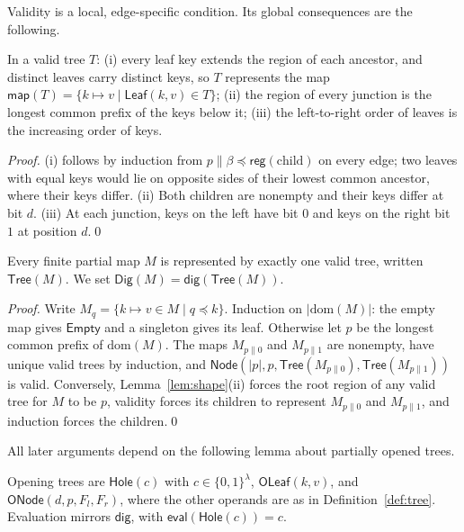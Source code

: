 \documentclass[runningheads]{llncs}
\newcommand{\dig}{\mathsf{dig}}
\newcommand{\Tree}{\mathsf{Tree}}
\newcommand{\Leaf}{\mathsf{Leaf}}
\newcommand{\Node}{\mathsf{Node}}
\newcommand{\Empty}{\mathsf{Empty}}
\newcommand{\reg}{\mathsf{reg}}
\newcommand{\map}{\mathsf{map}}
\newcommand{\eval}{\mathsf{eval}}
\newcommand{\Hole}{\mathsf{Hole}}
\newcommand{\OLeaf}{\mathsf{OLeaf}}
\newcommand{\ONode}{\mathsf{ONode}}
\newcommand{\dom}{\mathrm{dom}}
\newcommand{\cat}{\mathbin{\|}}
\begin{document}
Validity is a local, edge-specific condition. Its global consequences are the following.

\begin{lemma}[Shape]\label{lem:shape}
In a valid tree $T$: (i) every leaf key extends the region of each ancestor, and distinct leaves carry distinct keys, so $T$ represents the map $\map(T) = \{k \mapsto v \mid \Leaf(k,v) \in T\}$; (ii) the region of every junction is the longest common prefix of the keys below it; (iii) the left-to-right order of leaves is the increasing order of keys.
\end{lemma}
\begin{proof}
(i) follows by induction from $p \cat \beta \preceq \reg(\text{child})$ on every edge; two leaves with equal keys would lie on opposite sides of their lowest common ancestor, where their keys differ. (ii) Both children are nonempty and their keys differ at bit $d$. (iii) At each junction, keys on the left have bit $0$ and keys on the right bit $1$ at position $d$.\qed
\end{proof}

\begin{proposition}\label{prop:unique}
Every finite partial map $M$ is represented by exactly one valid tree, written $\Tree(M)$. We set $\mathsf{Dig}(M) = \dig(\Tree(M))$.
\end{proposition}
\begin{proof}
Write $M_q = \{k \mapsto v \in M \mid q \preceq k\}$. Induction on $|\dom(M)|$: the empty map gives $\Empty$ and a singleton gives its leaf. Otherwise let $p$ be the longest common prefix of $\dom(M)$. The maps $M_{p\cat 0}$ and $M_{p\cat 1}$ are nonempty, have unique valid trees by induction, and $\Node(|p|, p, \Tree(M_{p\cat 0}), \Tree(M_{p\cat 1}))$ is valid. Conversely, Lemma~\ref{lem:shape}(ii) forces the root region of any valid tree for $M$ to be $p$, validity forces its children to represent $M_{p\cat 0}$ and $M_{p\cat 1}$, and induction forces the children.\qed
\end{proof}

All later arguments depend on the following lemma about partially opened trees.

\begin{definition}\label{def:opening}
Opening trees are $\Hole(c)$ with $c \in \{0,1\}^{\lambda}$, $\OLeaf(k,v)$, and
$\ONode(d,p,F_l,F_r)$, where the other operands are as in Definition~\ref{def:tree}. Evaluation mirrors $\dig$, with $\eval(\Hole(c)) = c$.
\end{definition}
\end{document}
